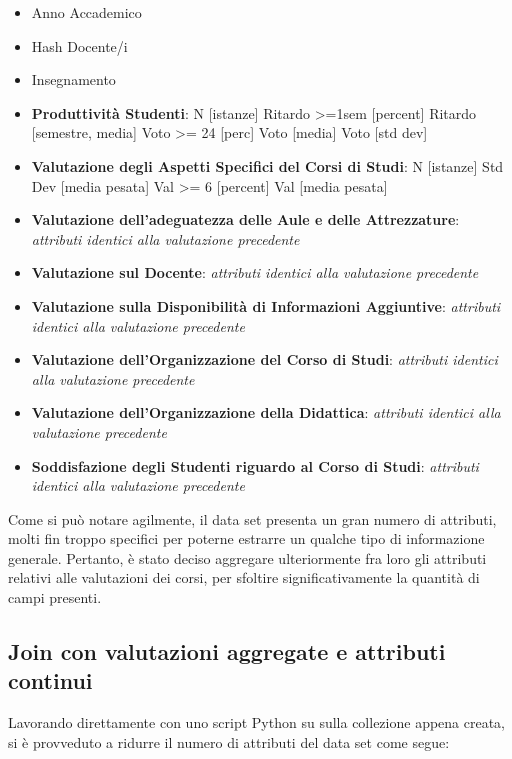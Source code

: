 		\begin{itemize}
			\item Anno Accademico
			\item Hash Docente/i
			\item Insegnamento
			\item \textbf{Produttività Studenti}:
				\subitem N [istanze]
				\subitem Ritardo >=1sem [percent]
				\subitem Ritardo [semestre, media]
				\subitem Voto >= 24 [perc]
				\subitem Voto [media]
				\subitem Voto [std dev]
			\item \textbf{Valutazione degli Aspetti Specifici del Corsi di Studi}:
				\subitem N [istanze]
				\subitem Std Dev [media pesata]
				\subitem Val >= 6 [percent]
				\subitem Val [media pesata]
			\item \textbf{Valutazione dell'adeguatezza delle Aule e delle Attrezzature}:
				\subitem \textit{attributi identici alla valutazione precedente}
			\item \textbf{Valutazione sul Docente}:
				\subitem \textit{attributi identici alla valutazione precedente}
			\item \textbf{Valutazione sulla Disponibilità di Informazioni Aggiuntive}:
				\subitem \textit{attributi identici alla valutazione precedente}
			\item \textbf{Valutazione dell'Organizzazione del Corso di Studi}:
				\subitem \textit{attributi identici alla valutazione precedente}
			\item \textbf{Valutazione dell'Organizzazione della Didattica}:
				\subitem \textit{attributi identici alla valutazione precedente}
			\item \textbf{Soddisfazione degli Studenti riguardo al Corso di Studi}:
				\subitem \textit{attributi identici alla valutazione precedente}
		\end{itemize}

		Come si può notare agilmente, il data set presenta un gran numero di attributi, molti fin troppo specifici per poterne estrarre un qualche tipo di informazione generale. Pertanto, è stato deciso aggregare ulteriormente fra loro gli attributi relativi alle valutazioni dei corsi, per sfoltire significativamente la quantità di campi presenti.
		
	\subsection{Join con valutazioni aggregate e attributi continui}

		Lavorando direttamente con uno script Python su sulla collezione appena creata, si è provveduto a ridurre il numero di attributi del data set come segue:

